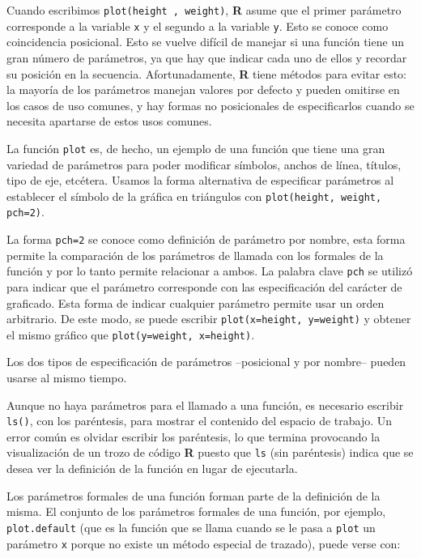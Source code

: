 Cuando escribimos \texttt{plot(height , weight)}, \textbf{R} asume que el
primer parámetro corresponde a la variable \texttt{x} y el segundo a la
variable \texttt{y}. Esto se conoce como coincidencia posicional. Esto se
vuelve difícil de manejar si una función tiene un gran número de parámetros, ya
que hay que indicar cada uno de ellos y recordar su posición en la secuencia.
Afortunadamente, \textbf{R} tiene métodos para evitar esto: la mayoría de los
parámetros manejan valores por defecto y pueden omitirse en los casos de uso
comunes, y hay formas no posicionales de especificarlos cuando se necesita
apartarse de estos usos comunes.

La función \texttt{plot} es, de hecho, un ejemplo de una función que tiene una
gran variedad de parámetros para poder modificar símbolos, anchos de línea,
títulos, tipo de eje, etcétera. Usamos la forma alternativa de especificar
parámetros al establecer el símbolo de la gráfica en triángulos con
\texttt{plot(height, weight, pch=2)}.

La forma \texttt{pch=2} se conoce como definición de parámetro por nombre, esta
forma permite la comparación de los parámetros de llamada con los formales de
la función y por lo tanto permite relacionar a ambos. La palabra clave
\texttt{pch} se utilizó para indicar que el parámetro corresponde con las
especificación del carácter de graficado. Esta forma de indicar cualquier
parámetro permite usar un orden arbitrario. De este modo, se puede escribir
\texttt{plot(x=height, y=weight)} y obtener el mismo gráfico que
\texttt{plot(y=weight, x=height)}.

Los dos tipos de especificación de parámetros --posicional y por nombre-- pueden
usarse al mismo tiempo.

Aunque no haya parámetros para el llamado a una función, es necesario escribir
\texttt{ls()}, con los paréntesis, para mostrar el contenido del espacio de
trabajo. Un error común es olvidar escribir los paréntesis, lo que termina
provocando la visualización de un trozo de código \textbf{R} puesto que
\texttt{ls} (sin paréntesis) indica que se desea ver la definición de la
función en lugar de ejecutarla.

Los parámetros formales de una función forman parte de la definición de la
misma. El conjunto de los parámetros formales de una función, por ejemplo,
\texttt{plot.default} (que es la función que se llama cuando se le pasa a
\texttt{plot} un parámetro \texttt{x} porque no existe un método especial de
trazado), puede verse con:


